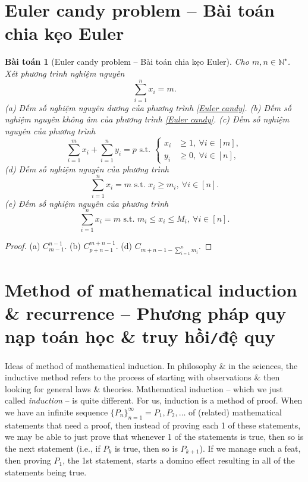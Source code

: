 \documentclass[oneside]{book}
\newtheorem{baitoan}{Bài toán}
\begin{document}

\section{Euler candy problem -- Bài toán chia kẹo Euler}

\begin{baitoan}[Euler candy problem -- Bài toán chia kẹo Euler]
	Cho $m,n\in\mathbb{N}^\star$. Xét phương trình nghiệm nguyên
	\begin{equation}
		\label{Euler candy}
		\sum_{i=1}^n x_i = m.
	\end{equation}
	(a) Đếm số nghiệm nguyên dương của phương trình \eqref{Euler candy}. (b) Đếm số nghiệm nguyên không âm của phương trình \eqref{Euler candy}. (c) Đếm số nghiệm nguyên của phương trình
	\begin{equation*}
		\sum_{i=1}^m x_i + \sum_{i=1}^n y_i = p\mbox{ s.t. }\left\{\begin{split}
			x_i&\ge1,\ \forall i\in[m],\\
			y_i&\ge0,\ \forall i\in[n],
		\end{split}\right.
	\end{equation*}
	(d) Đếm số nghiệm nguyên của phương trình
	\begin{equation*}
		\sum_{i=1}^n x_i = m\mbox{ s.t. } x_i\ge m_i,\ \forall i\in[n].
	\end{equation*}
	(e) Đếm số nghiệm nguyên của phương trình
	\begin{equation*}
		\sum_{i=1}^n x_i = m\mbox{ s.t. } m_i\le x_i\le M_i,\ \forall i\in[n].
	\end{equation*}
\end{baitoan}

\begin{proof}
	(a) $C_{m-1}^{n-1}$. (b) $C_{p + n - 1}^{m + n - 1}$. (d) $C_{m + n - 1 - \sum_{i=1}^n m_i}$.
\end{proof}


\section{Method of mathematical induction \& recurrence -- Phương pháp quy nạp toán học \& truy hồi{\tt/}đệ quy}
{\sf Ideas of method of mathematical induction.} In philosophy \& in the sciences, the inductive method refers to the process of starting with observations \& then looking for general laws \& theories. Mathematical induction -- which we just called {\it induction} -- is quite different. For us, induction is a method of proof. When we have an infinite sequence $\{P_n\}_{n=1}^\infty = P_1,P_2,\ldots$ of (related) mathematical statements that need a proof, then instead of proving each 1 of these statements, we may be able to just prove that whenever 1 of the statements is true, then so is the next statement (i.e., if $P_k$ is true, then so is $P_{k+1}$). If we manage such a feat, then proving $P_1$, the 1st statement, starts a domino effect resulting in all of the statements being true.
\end{document}
